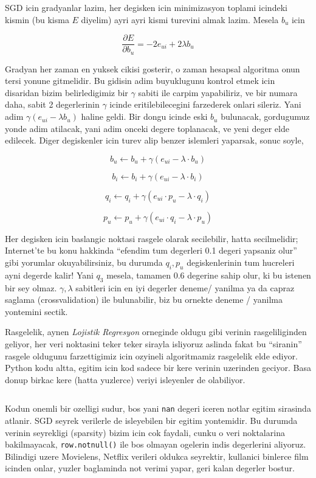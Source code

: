 \documentclass[12pt,fleqn]{article}\usepackage{../common}
\begin{document}
SGD icin gradyanlar lazim, her degisken icin minimizasyon toplami icindeki
kismin (bu kisma $E$ diyelim) ayri ayri kismi turevini almak lazim. Mesela
$b_u$ icin

$$ \frac{\partial E}{\partial b_u}  = -2e_{ui} + 2 \lambda b_u
$$

Gradyan her zaman en yuksek cikisi gosterir, o zaman hesapsal algoritma
onun tersi yonune gitmelidir. Bu gidisin adim buyuklugunu kontrol etmek
icin disaridan bizim belirledigimiz bir $\gamma$ sabiti ile carpim
yapabiliriz, ve bir numara daha, sabit 2 degerlerinin $\gamma$ icinde
eritilebilecegini farzederek onlari sileriz. Yani adim $\gamma(e_{ui} -
\lambda b_u)$ haline geldi. Bir dongu icinde eski $b_u$ bulunacak,
gordugumuz yonde adim atilacak, yani adim onceki degere toplanacak, ve yeni
deger elde edilecek. Diger degiskenler icin turev alip benzer islemleri
yaparsak, sonuc soyle,

$$ b_u \leftarrow b_u + \gamma (e_{ui} - \lambda \cdot b_u) $$

$$ b_i \leftarrow b_i + \gamma (e_{ui} - \lambda \cdot b_i) $$

$$ q_i \leftarrow q_i + \gamma (e_{ui}\cdot p_u - \lambda \cdot q_i) $$

$$ p_u \leftarrow p_u + \gamma (e_{ui}\cdot q_i - \lambda \cdot p_u) $$

Her degisken icin baslangic noktasi rasgele olarak secilebilir, hatta
secilmelidir; Internet'te bu konu hakkinda ``efendim tum degerleri 0.1
degeri yapsaniz olur'' gibi yorumlar okuyabilirsiniz, bu durumda $q_i,p_u$
degiskenlerinin tum hucreleri ayni degerde kalir! Yani $q_3$ mesela,
tamamen 0.6 degerine sahip olur, ki bu istenen bir sey
olmaz. $\gamma,\lambda$ sabitleri icin en iyi degerler deneme/ yanilma ya
da capraz saglama (crossvalidation) ile bulunabilir, biz bu ornekte deneme
/ yanilma yontemini sectik.

Rasgelelik, aynen {\em Lojistik Regresyon} orneginde oldugu gibi verinin
rasgeliliginden geliyor, her veri noktasini teker teker sirayla isliyoruz
aslinda fakat bu ``siranin'' rasgele oldugunu farzettigimiz icin ozyineli 
algoritmamiz rasgelelik elde ediyor. Python kodu altta, egitim icin kod
sadece bir kere verinin uzerinden geciyor. Basa donup birkac kere (hatta
yuzlerce) veriyi isleyenler de olabiliyor.

\inputminted[fontsize=\footnotesize]{python}{ssvd.py}

Kodun onemli bir ozelligi sudur, bos yani \verb!nan! degeri iceren notlar
egitim sirasinda atlanir. SGD seyrek verilerle de isleyebilen bir egitim
yontemidir. Bu durumda verinin seyrekligi (sparsity) bizim icin cok
faydali, cunku o veri noktalarina bakilmayacak, \verb!row.notnull()! ile
bos olmayan ogelerin indis degerlerini aliyoruz. Bilindigi uzere Movielens,
Netflix verileri oldukca seyrektir, kullanici binlerce film icinden onlar,
yuzler baglaminda not verimi yapar, geri kalan degerler bostur. 
\end{document}
